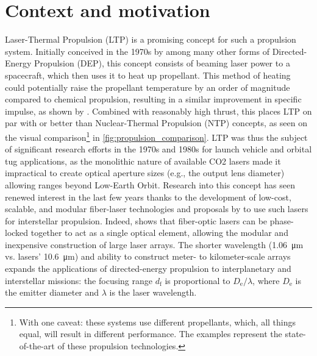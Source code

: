     \section{Context and motivation}
        Laser-Thermal Propulsion (LTP) is a promising concept for such a propulsion system. Initially conceived in the 1970s by \textcite{kantrowitzRelevanceSpace1971} among many other forms of Directed-Energy Propulsion (DEP), this concept consists of beaming laser power to a spacecraft, which then uses it to heat up propellant. This method of heating could potentially raise the propellant temperature by an order of magnitude compared to chemical propulsion, resulting in a similar improvement in specific impulse, as shown by \textcite{noredApplicationHighPower1976}. Combined with reasonably high thrust, this places LTP on par with or better than Nuclear-Thermal Propulsion (NTP) concepts, as seen on the visual comparison\footnote{With one caveat: these systems use different propellants, which, all things equal, will result in different performance. The examples represent the state-of-the-art of these propulsion technologies.} in \autoref{fig:propulsion_comparison}. LTP was thus the subject of significant research efforts in the 1970s and 1980s for launch vehicle and orbital tug applications, as the monolithic nature of available CO2 lasers made it impractical to create optical aperture sizes (e.g., the output lens diameter) allowing ranges beyond Low-Earth Orbit. Research into this concept has seen renewed interest in the last few years thanks to the development of low-cost, scalable, and modular fiber-laser technologies and proposals by \textcite{lubinRoadmapInterstellarFlight2016a} to use such lasers for interstellar propulsion. Indeed, \citeauthor{lubinRoadmapInterstellarFlight2016a} shows that fiber-optic lasers can be phase-locked together to act as a single optical element, allowing the modular and inexpensive construction of large laser arrays. The shorter wavelength (\qty{1.06}{\um} vs.  lasers' \qty{10.6}{\um}) and ability to construct meter- to kilometer-scale arrays expands the applications of directed-energy propulsion to interplanetary and interstellar missions: the focusing range $d_\mathrm{f}$ is proportional to $D_\mathrm{e}/\lambda$, where $D_\mathrm{e}$ is the emitter diameter and $\lambda$ is the laser wavelength.

